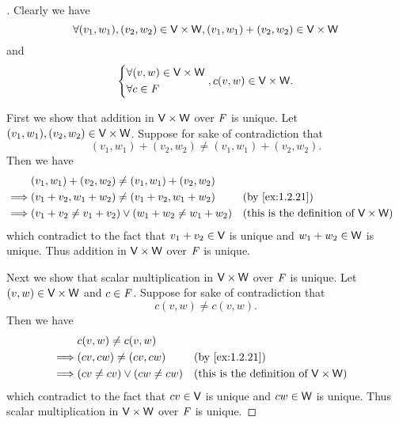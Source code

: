 \begin{proof}[]
	Clearly we have
	\[
		\forall (v_1, w_1), (v_2, w_2) \in \mathsf{V} \times \mathsf{W}, (v_1, w_1) + (v_2, w_2) \in \mathsf{V} \times \mathsf{W}
	\]
	and
	\[
		\begin{dcases}
			\forall (v, w) \in \mathsf{V} \times \mathsf{W} \\
			\forall c \in \mathit{F}
		\end{dcases}, c (v, w) \in \mathsf{V} \times \mathsf{W}.
	\]

	First we show that addition in \(\mathsf{V} \times \mathsf{W}\) over \(\mathit{F}\) is unique.
	Let \((v_1, w_1), (v_2, w_2) \in \mathsf{V} \times \mathsf{W}\).
	Suppose for sake of contradiction that
	\[
		(v_1, w_1) + (v_2, w_2) \neq (v_1, w_1) + (v_2, w_2).
	\]
	Then we have
	\begin{align*}
		         & (v_1, w_1) + (v_2, w_2) \neq (v_1, w_1) + (v_2, w_2)                                                                \\
		\implies & (v_1 + v_2, w_1 + w_2) \neq (v_1 + v_2, w_1 + w_2)         &  & \text{(by \cref{ex:1.2.21})}                        \\
		\implies & (v_1 + v_2 \neq v_1 + v_2) \lor (w_1 + w_2 \neq w_1 + w_2) &  & \text{(this is the definition of \(\V \times \W\))}
	\end{align*}
	which contradict to the fact that \(v_1 + v_2 \in \mathsf{V}\) is unique and \(w_1 + w_2 \in \mathsf{W}\) is unique.
	Thus addition in \(\mathsf{V} \times \mathsf{W}\) over \(\mathit{F}\) is unique.

	Next we show that scalar multiplication in \(\mathsf{V} \times \mathsf{W}\) over \(\mathit{F}\) is unique.
	Let \((v, w) \in \mathsf{V} \times \mathsf{W}\) and \(c \in \mathit{F}\).
	Suppose for sake of contradiction that
	\[
		c(v, w) \neq c(v, w).
	\]
	Then we have
	\begin{align*}
		         & c(v, w) \neq c(v, w)                                                                    \\
		\implies & (cv, cw) \neq (cv, cw)         &  & \text{(by \cref{ex:1.2.21})}                        \\
		\implies & (cv \neq cv) \lor (cw \neq cw) &  & \text{(this is the definition of \(\V \times \W\))}
	\end{align*}
	which contradict to the fact that \(cv \in \mathsf{V}\) is unique and \(cw \in \mathsf{W}\) is unique.
	Thus scalar multiplication in \(\mathsf{V} \times \mathsf{W}\) over \(\mathit{F}\) is unique.


\end{proof}
